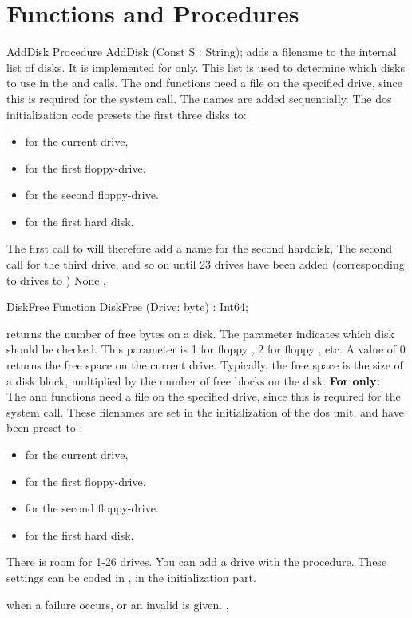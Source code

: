 \section{Functions and Procedures}
\begin{procedure}{AddDisk}
\Declaration
Procedure AddDisk (Const S : String);
\Description
{} adds a filename  to the internal list of disks. It is
implemented for \linux only.
 This list is used to determine which disks to use in the 
and  calls. 
The  and  functions need a file on the 
specified drive, since this is required for the  system call.
The names are added sequentially. The dos
initialization code presets the first three disks to:
\begin{itemize}
\item {} for the current drive, 
\item {} for the first floppy-drive.
\item {} for the second floppy-drive.
\item {} for the first hard disk.
\end{itemize}
The first call to  will therefore add a name for the second
harddisk, The second call for the third drive, and so on until 23 drives
have been added (corresponding to drives  to )
\Errors
None
\SeeAlso
{},  
\end{procedure}


\begin{function}{DiskFree}
\Declaration
Function DiskFree (Drive: byte) : Int64;
\Description

 returns the number of free bytes on a disk. The parameter
 indicates which disk should be checked. This parameter is 1 for
floppy , 2 for floppy , etc. A value of 0 returns the free
space on the current drive. 
Typically, the free space is the size of a disk block, multiplied by the
number of free blocks on the disk.
\textbf{For \linux only:}\\
The  and  functions need a file on the 
specified drive, since this is required for the  system call.
These filenames are set in the initialization of the dos unit, and have 
been preset to :
\begin{itemize}
\item {} for the current drive, 
\item {} for the first floppy-drive.
\item {} for the second floppy-drive.
\item {} for the first hard disk.
\end{itemize}
There is room for 1-26 drives. You can add a drive with the
 procedure.
These settings can be coded in , in the initialization part.

 when a failure occurs, or an invalid  is given.
\SeeAlso
{}, 
\end{function}

